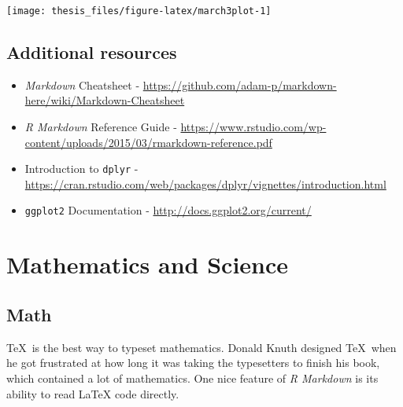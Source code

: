 \documentclass[12pt,twoside]{reedthesis}
\begin{document}
  \begin{Shaded}
  \end{Shaded}
  
  \begin{center}\texttt{[image: thesis\_files/figure-latex/march3plot-1]} \end{center}
  
  \section{Additional resources}\label{additional-resources}
  
  \begin{itemize}
  \item
    \emph{Markdown} Cheatsheet -
    \url{https://github.com/adam-p/markdown-here/wiki/Markdown-Cheatsheet}
  \item
    \emph{R Markdown} Reference Guide -
    \url{https://www.rstudio.com/wp-content/uploads/2015/03/rmarkdown-reference.pdf}
  \item
    Introduction to \texttt{dplyr} -
    \url{https://cran.rstudio.com/web/packages/dplyr/vignettes/introduction.html}
  \item
    \texttt{ggplot2} Documentation -
    \url{http://docs.ggplot2.org/current/}
  \end{itemize}
  
  \hypertarget{math-sci}{\chapter{Mathematics and
  Science}\label{math-sci}}
  
  \hypertarget{math}{\section{Math}\label{math}}
  
  \TeX~is the best way to typeset mathematics. Donald Knuth designed
  \TeX~when he got frustrated at how long it was taking the typesetters to
  finish his book, which contained a lot of mathematics. One nice feature
  of \emph{R Markdown} is its ability to read LaTeX code directly.
  
\end{document}

